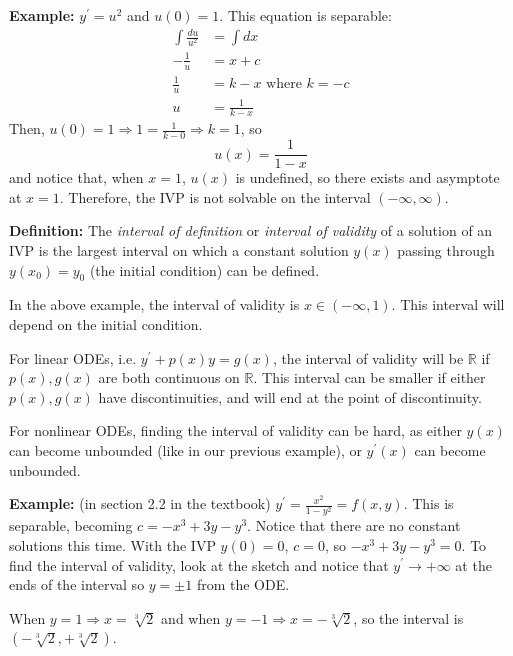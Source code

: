 \documentclass[11pt]{article}
\newcommand{\example}{\textbf{Example: }}
\newcommand{\definition}{\textbf{Definition: }}
\newcommand{\yp}{y^{\prime}}
\begin{document}
	\example $\yp = u^2$ and $u(0) = 1$. This equation is separable:
		\begin{align*}
			\int \frac{du}{u^2} &= \int dx \\
			- \frac{1}{u} &= x + c \\
			\frac{1}{u} &= k - x \text{ where } k = -c \\
			u &= \frac{1}{k-x}
		\end{align*}
	Then, $u(0) = 1 \Rightarrow 1 = \frac{1}{k-0} \Rightarrow k = 1$, so
		$$ u(x) = \frac{1}{1-x} $$
	and notice that, when $x = 1$, $u(x)$ is undefined, so there exists and asymptote at $x=1$. Therefore, the IVP is not solvable on the interval $(-\infty, \infty)$.


	\definition The \emph{interval of definition} or \emph{interval of validity} of a solution of an IVP is the largest interval on which a constant solution $y(x)$ passing through $y(x_0) = y_0$ (the initial condition) can be defined.

	In the above example, the interval of validity is $x \in (-\infty, 1)$. This interval will depend on the initial condition.

	For linear ODEs, i.e. $\yp + p(x) y = g(x)$, the interval of validity will be $\mathbb{R}$ if $p(x), g(x)$ are both continuous on $\mathbb{R}$. This interval can be smaller if either $p(x), g(x)$ have discontinuities, and will end at the point of discontinuity.

	For nonlinear ODEs, finding the interval of validity can be hard, as either $y(x)$ can become unbounded (like in our previous example), or $\yp(x)$ can become unbounded.

	\example (in section 2.2 in the textbook) $\yp = \frac{x^2}{1 - y^2} = f(x,y)$. This is separable, becoming $c = -x^3 + 3y - y^3$. Notice that there are no constant solutions this time. With the IVP $y(0) = 0$, $c = 0$, so $-x^3 + 3 y - y^3 = 0$. To find the interval of validity, look at the sketch and notice that $\yp \to + \infty$ at the ends of the interval so $y = \pm 1$ from the ODE.

	When $y = 1 \Rightarrow x = \sqrt[3]{2}$ and when $y = -1 \Rightarrow x = - \sqrt[3]{2}$, so the interval is $(-\sqrt[3]{2}, +\sqrt[3]{2})$.
\end{document}
